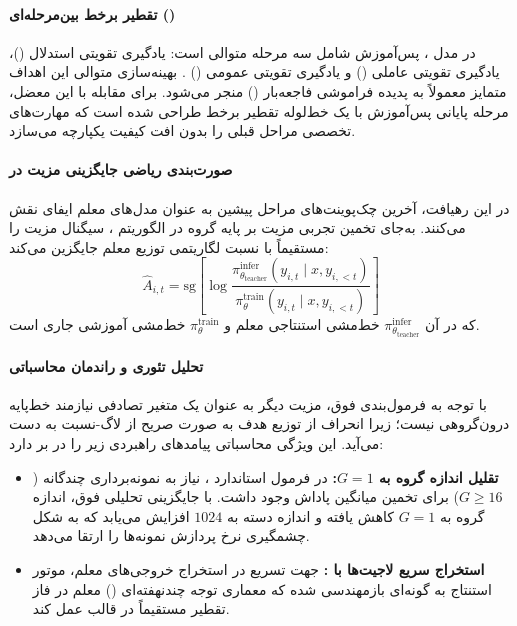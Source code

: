 \item {}

\paragraph*{تقطیر برخط بین‌مرحله‌ای ()}
در مدل ، پس‌آموزش شامل سه مرحله متوالی است: یادگیری تقویتی استدلال ()، یادگیری تقویتی عاملی () و یادگیری تقویتی عمومی () \cite{glm2026v5}. بهینه‌سازی متوالی این اهداف متمایز معمولاً به پدیده فراموشی فاجعه‌بار () منجر می‌شود. برای مقابله با این معضل، مرحله پایانی پس‌آموزش با یک خط‌لوله تقطیر برخط طراحی شده است که مهارت‌های تخصصی مراحل قبلی را بدون افت کیفیت یکپارچه می‌سازد.

\paragraph*{صورت‌بندی ریاضی جایگزینی مزیت در }
در این رهیافت، آخرین چک‌پوینت‌های مراحل پیشین به عنوان مدل‌های معلم ایفای نقش می‌کنند.  به‌جای تخمین تجربی مزیت بر پایه گروه در الگوریتم  \cite{shao2024deepseekmath}، سیگنال مزیت را مستقیماً با نسبت لگاریتمی توزیع معلم جایگزین می‌کند:
\begin{equation}
    \hat{A}_{i, t} = \mathrm{sg} \left[ \log \frac{\pi_{\theta_{\text{teacher}}}^{\text{infer}}(y_{i, t} \mid x, y_{i, <t})}{\pi_\theta^{\text{train}}(y_{i, t} \mid x, y_{i, <t})} \right]
\end{equation}
که در آن $\pi_{\theta_{\text{teacher}}}^{\text{infer}}$ خط‌مشی استنتاجی معلم و $\pi_\theta^{\text{train}}$ خط‌مشی آموزشی جاری است.

\paragraph*{تحلیل تئوری و راندمان محاسباتی}
با توجه به فرمول‌بندی فوق، مزیت دیگر به عنوان یک متغیر تصادفی نیازمند خط‌پایه درون‌گروهی نیست؛ زیرا انحراف از توزیع هدف به صورت صریح از لاگ-نسبت به دست می‌آید. این ویژگی محاسباتی پیامدهای راهبردی زیر را در بر دارد:
\begin{itemize}
    \item \textbf{تقلیل اندازه گروه به $G=1$:} در فرمول استاندارد ، نیاز به نمونه‌برداری چندگانه ($G \ge 16$) برای تخمین میانگین پاداش وجود داشت. با جایگزینی تحلیلی فوق، اندازه گروه به $G=1$ کاهش یافته و اندازه دسته به $1024$ افزایش می‌یابد که به شکل چشمگیری نرخ پردازش نمونه‌ها را ارتقا می‌دهد.
    \item \textbf{استخراج سریع لاجیت‌ها با :} جهت تسریع در استخراج خروجی‌های معلم، موتور استنتاج به گونه‌ای بازمهندسی شده که معماری توجه چندنهفته‌ای () معلم در فاز تقطیر مستقیماً در قالب  عمل کند.
\end{itemize}

